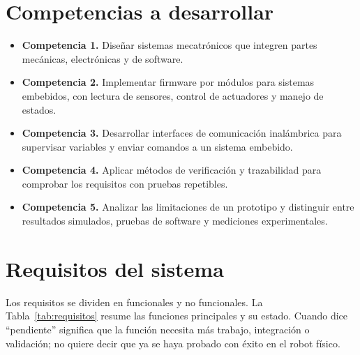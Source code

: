 \documentclass[journal]{IEEEtran}
\begin{document}

\section{Competencias a desarrollar}

\begin{itemize}
    \item \textbf{Competencia 1.} Diseñar sistemas mecatrónicos que integren partes mecánicas, electrónicas y de software.

    \item \textbf{Competencia 2.} Implementar firmware por módulos para sistemas embebidos, con lectura de sensores, control de actuadores y manejo de estados.

    \item \textbf{Competencia 3.} Desarrollar interfaces de comunicación inalámbrica para supervisar variables y enviar comandos a un sistema embebido.

    \item \textbf{Competencia 4.} Aplicar métodos de verificación y trazabilidad para comprobar los requisitos con pruebas repetibles.

    \item \textbf{Competencia 5.} Analizar las limitaciones de un prototipo y distinguir entre resultados simulados, pruebas de software y mediciones experimentales.
\end{itemize}


\section{Requisitos del sistema}

Los requisitos se dividen en funcionales y no funcionales. La Tabla~\ref{tab:requisitos} resume las funciones principales y su estado. Cuando dice ``pendiente'' significa que la función necesita más trabajo, integración o validación; no quiere decir que ya se haya probado con éxito en el robot físico.
\end{document}

